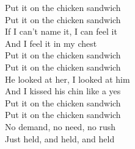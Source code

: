 \begin{lyrics}
Put it on the chicken sandwich\\
Put it on the chicken sandwich\\
If I can’t name it, I can feel it\\
And I feel it in my chest\\
Put it on the chicken sandwich\\
Put it on the chicken sandwich\\
He looked at her, I looked at him\\
And I kissed his chin like a yes\\
Put it on the chicken sandwich\\
Put it on the chicken sandwich\\
No demand, no need, no rush\\
Just held, and held, and held
\end{lyrics}


